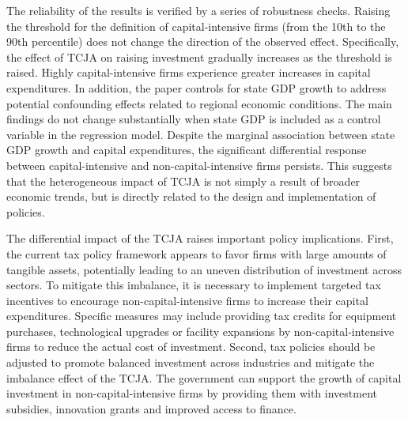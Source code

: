 \documentclass[11pt]{article}
\begin{document}
The reliability of the results is verified by a series of robustness checks. Raising the threshold for the definition of capital-intensive firms (from the 10th to the 90th percentile) does not change the direction of the observed effect. Specifically, the effect of TCJA on raising investment gradually increases as the threshold is raised. Highly capital-intensive firms experience greater increases in capital expenditures. In addition, the paper controls for state GDP growth to address potential confounding effects related to regional economic conditions. The main findings do not change substantially when state GDP is included as a control variable in the regression model. Despite the marginal association between state GDP growth and capital expenditures, the significant differential response between capital-intensive and non-capital-intensive firms persists. This suggests that the heterogeneous impact of TCJA is not simply a result of broader economic trends, but is directly related to the design and implementation of policies.

The differential impact of the TCJA raises important policy implications. First, the current tax policy framework appears to favor firms with large amounts of tangible assets, potentially leading to an uneven distribution of investment across sectors. To mitigate this imbalance, it is necessary to implement targeted tax incentives to encourage non-capital-intensive firms to increase their capital expenditures. Specific measures may include providing tax credits for equipment purchases, technological upgrades or facility expansions by non-capital-intensive firms to reduce the actual cost of investment. Second, tax policies should be adjusted to promote balanced investment across industries and mitigate the imbalance effect of the TCJA. The government can support the growth of capital investment in non-capital-intensive firms by providing them with investment subsidies, innovation grants and improved access to finance.
\end{document}
